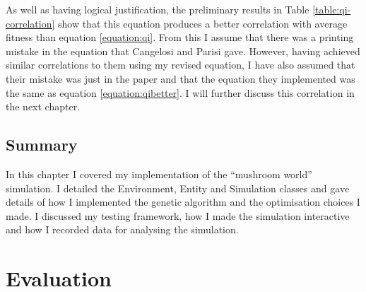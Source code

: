 \documentclass[12pt,a4paper,twoside,openright]{report}
\begin{document}
As well as having logical justification, the preliminary results in Table \ref{table:qi-correlation} show that this equation produces a better correlation with average fitness than equation \ref{equation:qi}. From this I assume that there was a printing mistake in the equation that Cangelosi and Parisi gave. However, having achieved similar correlations to them using my revised equation, I have also assumed that their mistake was just in the paper and that the equation they implemented was the same as equation \ref{equation:qibetter}. I will further discuss this correlation in the next chapter.

\section{Summary}

In this chapter I covered my implementation of the ``mushroom world'' simulation. I detailed the Environment, Entity and Simulation classes and gave details of how I implemented the genetic algorithm and the optimisation choices I made. I discussed my testing framework, how I made the simulation interactive and how I recorded data for analysing the simulation. 


\chapter{Evaluation}




\end{document}
